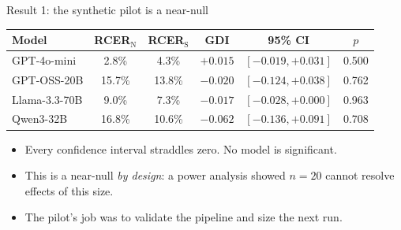\documentclass[aspectratio=169,11pt]{beamer}
\begin{document}
\begin{frame}{Result 1: the synthetic pilot is a near-null}
  \begin{center}
  \renewcommand{\arraystretch}{1.3}
  \footnotesize
  \begin{tabular}{@{}lccccc@{}}
    \toprule
    \textbf{Model} & \textbf{RCER$_\text{N}$} & \textbf{RCER$_\text{S}$} & \textbf{GDI} & \textbf{95\% CI} & \textbf{$p$}\\
    \midrule
    GPT-4o-mini    & 2.8\%  & 4.3\%  & $+0.015$ & $[-0.019,+0.031]$ & 0.500\\
    GPT-OSS-20B    & 15.7\% & 13.8\% & $-0.020$ & $[-0.124,+0.038]$ & 0.762\\
    Llama-3.3-70B  & 9.0\%  & 7.3\%  & $-0.017$ & $[-0.028,+0.000]$ & 0.963\\
    Qwen3-32B      & 16.8\% & 10.6\% & $-0.062$ & $[-0.136,+0.091]$ & 0.708\\
    \bottomrule
  \end{tabular}
  \end{center}
  \vspace{0.6em}
  \begin{itemize}
    \item Every confidence interval straddles zero. No model is significant.
    \item This is a near-null \emph{by design}: a power analysis showed
    $n=20$ cannot resolve effects of this size.
    \item The pilot's job was to validate the pipeline and size the next run.
  \end{itemize}
\end{frame}
\end{document}
